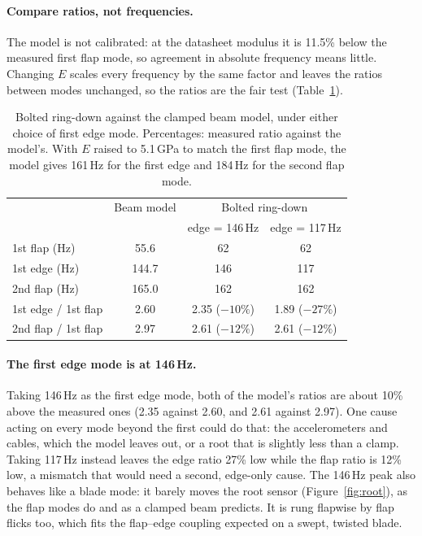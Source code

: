 \documentclass[11pt]{article}
\begin{document}
\paragraph{Compare ratios, not frequencies.} The model is not calibrated: at
the datasheet modulus it is 11.5\% below the measured first flap mode, so
agreement in absolute frequency means little. Changing $E$ scales every
frequency by the same factor and leaves the ratios between modes unchanged,
so the ratios are the fair test (Table~\ref{tab:interp}).

\begin{table}[H]
  \centering
  \begin{tabular}{lccc}
    \toprule
    & Beam model & \multicolumn{2}{c}{Bolted ring-down} \\
    & & edge = 146\,Hz & edge = 117\,Hz \\
    \midrule
    1st flap (Hz) & 55.6 & 62 & 62 \\
    1st edge (Hz) & 144.7 & 146 & 117 \\
    2nd flap (Hz) & 165.0 & 162 & 162 \\
    \midrule
    1st edge / 1st flap & 2.60 & 2.35 ($-10\%$) & 1.89 ($-27\%$) \\
    2nd flap / 1st flap & 2.97 & 2.61 ($-12\%$) & 2.61 ($-12\%$) \\
    \bottomrule
  \end{tabular}
  \caption{Bolted ring-down against the clamped beam model, under either
  choice of first edge mode. Percentages: measured ratio against the model's.
  With $E$ raised to 5.1\,GPa to match the first flap mode, the model gives
  161\,Hz for the first edge and 184\,Hz for the second flap mode.}
  \label{tab:interp}
\end{table}

\paragraph{The first edge mode is at 146\,Hz.} Taking 146\,Hz as the first
edge mode, both of the model's ratios are about 10\% above the measured ones
(2.35 against 2.60, and 2.61 against 2.97). One cause acting on every mode
beyond the first could do that: the accelerometers and cables, which the
model leaves out, or a root that is slightly less than a clamp. Taking 117\,Hz
instead leaves the edge ratio 27\% low while the flap ratio is 12\% low, a
mismatch that would need a second, edge-only cause. The 146\,Hz peak also
behaves like a blade mode: it barely moves the root sensor
(Figure~\ref{fig:root}), as the flap modes do and as a clamped beam
predicts. It is rung flapwise by flap flicks too, which fits the flap--edge
coupling expected on a swept, twisted blade.
\end{document}
